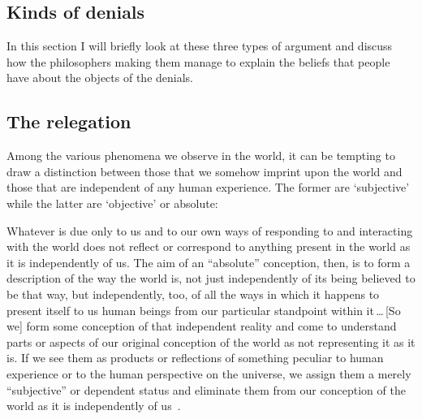 \documentclass[11pt]{article}
\newenvironment{squote}{%
	\begin{spacing}{1}
	\begin{list}{}{%
	\setlength{\labelwidth}{0pt}%
	\rightmargin\leftmargin%
	}
	\item\relax
	}{%
	\end{list}%
	\end{spacing}
	}
\begin{document}
\begin{spacing}{1.5}
\section{Kinds of denials}
In this section I will briefly look at these three types of argument
and discuss how the philosophers making them manage to explain the
beliefs that people have about the objects of the denials.

\subsection{The relegation}
\label{relegate}
Among the various phenomena we observe in the world, it can be
tempting to draw a distinction between those that we somehow imprint
upon the world and those that are independent of any human experience.
The former are `subjective' while the latter are `objective' or
absolute:
\begin{squote}
Whatever is due only to us and to our own ways of responding to and
interacting with the world does not reflect or correspond to anything
present in the world as it is independently of us.  The aim of an
``absolute'' conception, then, is to form a description of the way the
world is, not just independently of its being believed to be that way,
but independently, too, of all the ways in which it happens to present
itself to us human beings from our particular standpoint within
it\,\ldots\,[So we] form some conception of that independent reality
and come to understand parts or aspects of our original conception of
the world as not representing it as it is.  If we see them as products
or reflections of something peculiar to human experience or to the
human perspective on the universe, we assign them a merely
``subjective'' or dependent status and eliminate them from our
conception of the world as it is independently of
us~\citep[30--31]{stroud2000a}.
\end{squote}


\end{spacing}
\end{document}
